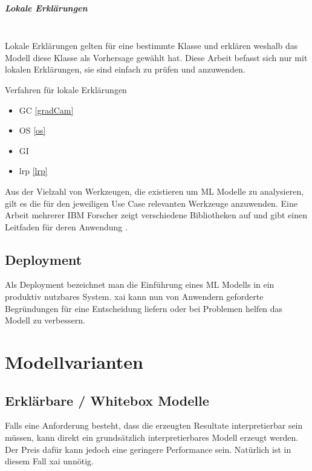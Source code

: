 \documentclass[
  12pt, %
  a4paper, %
  oneside, %
  openany, 
  numbers=noenddot, %
  BCOR=5mm, %
  parskip=half*, %
  thesis, %
]{bfhbook}
\newcommand{\parag}[1]{\paragraph*{#1}\mbox{}\\}
\begin{document}
\parag{Lokale Erklärungen}
Lokale Erklärungen gelten für eine bestimmte Klasse und erklären weshalb das Modell diese Klasse als Vorhersage gewählt hat. Diese Arbeit befasst sich nur mit lokalen Erklärungen, sie sind einfach zu prüfen und anzuwenden.

Verfahren für lokale Erklärungen
\begin{itemize}
	\item \Gls{GC} \ref{gradCam}
	\item \Gls{OS} \ref{os}
	\item \Gls{GI}
	\item \Gls{lrp}  \ref{lrp}
\end{itemize}

Aus der Vielzahl von Werkzeugen, die existieren um \Gls{ML} Modelle zu analysieren, gilt es die für den jeweiligen Use Case relevanten Werkzeuge anzuwenden. Eine Arbeit mehrerer IBM Forscher zeigt verschiedene Bibliotheken auf und gibt einen Leitfaden für deren Anwendung \parencite{Arya2019}.  

\section{Deployment}
Als Deployment bezeichnet man die Einführung eines \Gls{ML} Modells in ein produktiv nutzbares System. \Gls{xai} kann nun von Anwendern geforderte Begründungen für eine Entscheidung liefern oder bei Problemen helfen das Modell zu verbessern.

\chapter{Modellvarianten}
\section{Erklärbare / Whitebox Modelle}

Falls eine Anforderung besteht, dass die erzeugten Resultate interpretierbar sein müssen, kann direkt ein grundsätzlich interpretierbares Modell erzeugt werden. Der Preis dafür kann jedoch eine geringere Performance sein. Natürlich ist in diesem Fall \Gls{xai} unnötig.
\end{document}
